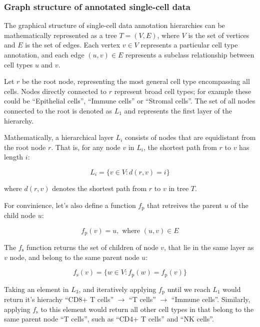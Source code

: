 \subsubsection*{Graph structure of annotated single-cell data}

The graphical structure of single-cell data annotation hierarchies can be mathematically represented as a tree $T = (V, E)$, where $V$ is the set of vertices and $E$ is the set of edges. Each vertex $v \in V$ represents a particular cell type annotation, and each edge $(u, v) \in E$ represents a subclass relationship between cell types $u$ and $v$. 

Let $r$ be the root node, representing the most general cell type encompassing all cells. Nodes directly connected to $r$ represent broad cell types; for example these could be ``Epithelial cells'', ``Immune cells'' or ``Stromal cells''. The set of all nodes connected to the root is denoted as $L_1$ and represents the first layer of the hierarchy. 

Mathematically, a hierarchical layer $L_i$ consists of nodes that are equidistant from the root node $r$. That is, for any node $v$ in $L_i$, the shortest path from $r$ to $v$ has length $i$:

\begin{equation}
    L_i = \{v \in V : d(r, v) = i\}
\end{equation}

where $d(r,v)$ denotes the shortest path from $r$ to $v$ in tree $T$. 

For convinience, let's also define a function $f_{\text{p}}$  that retreives the parent $u$ of the child node $u$:

\begin{equation}
    f_{\text{p}}(v) = u, \text{ where } (u, v) \in E
\end{equation}

The $f_{\text{s}}$ function  returns the set of children of node $v$, that lie in the same layer as $v$ node, and belong to the same parent node $u$:

\begin{equation}
    f_{\text{s}}(v) = \{w \in V : f_{\text{p}}(w) = f_{\text{p}}(v)\}
\end{equation}

Taking an element in $L_3$, and iteratively applying $f_{\text{p}}$ until we reach $L_1$  would return it's hierachy ``CD8+ T cells'' $\rightarrow$ ``T cells'' $\rightarrow$ ``Immune cells''. Similarly, applying $f_{\text{s}}$ to this element would return all other cell types in that belong to the same parent node ``T cells'', such as ``CD4+ T cells'' and ``NK cells''.

